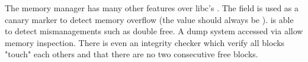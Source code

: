 The memory manager has many other features over libc's . The field  is used as a canary marker to detect memory overflow (the value should always be ).  is able to detect mismanagements such as double free. A dump system accessed via  allow memory inspection.  There is even an integrity checker  which verify all blocks "touch" each others and that there are no two consecutive free blocks.\\
\par
{}

\pagebreak
